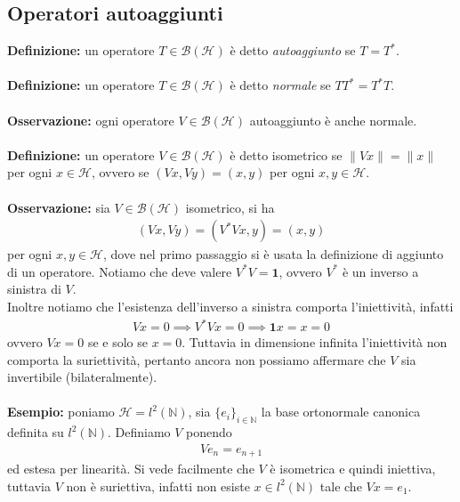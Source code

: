 \documentclass{article}
\numberwithin{equation}{subsection}
\begin{document}
\subsection{Operatori autoaggiunti}
\textbf{Definizione:} un operatore $T \in \mathcal{B}(\mathcal{H})$ è detto \textit{autoaggiunto} se $T = T^*$. \\ \\
\textbf{Definizione:} un operatore $T \in \mathcal{B}(\mathcal{H})$ è detto \textit{normale} se $TT^* = T^*T$. \\ \\
\textbf{Osservazione:} ogni operatore $V \in \mathcal{B}(\mathcal{H})$ autoaggiunto è anche normale. \\ \\
\textbf{Definizione:} un operatore $V \in \mathcal{B}(\mathcal{H})$ è detto isometrico se $\|Vx\| = \|x\|$ per ogni $x \in \mathcal{H}$, ovvero se $(Vx, Vy) = (x, y)$ per ogni $x, y \in \mathcal{H}$. \\ \\
\textbf{Osservazione:} sia $V \in \mathcal{B}(\mathcal{H})$ isometrico, si ha 
\begin{align*}
    (Vx, Vy) = (V^*Vx, y) = (x, y) 
\end{align*}
per ogni $x, y \in \mathcal{H}$, dove nel primo passaggio si è usata la definizione di aggiunto di un operatore. Notiamo che deve valere $V^*V = \mathbf{1}$, ovvero $V^*$ è un inverso a sinistra di $V$. \\
Inoltre notiamo che l'esistenza dell'inverso a sinistra comporta l'iniettività, infatti 
\begin{align*}
    Vx = 0 \implies V^*Vx = 0 \implies \mathbf{1}x = x = 0 
\end{align*}
ovvero $Vx = 0$ se e solo se $x = 0$. Tuttavia in dimensione infinita l'iniettività non comporta la suriettività, pertanto ancora non possiamo affermare che $V$ sia invertibile (bilateralmente). \\ \\
\textbf{Esempio:} poniamo $\mathcal{H} = l^2(\mathbb{N})$, sia $\{e_i\}_{i \in \mathbb{N}}$ la base ortonormale canonica definita su $l^2(\mathbb{N})$. Definiamo $V$ ponendo 
\begin{align*}
    Ve_n = e_{n + 1} 
\end{align*}
ed estesa per linearità. Si vede facilmente che $V$ è isometrica e quindi iniettiva, tuttavia $V$ non è suriettiva, infatti non esiste $x \in l^2(\mathbb{N})$ tale che $Vx = e_1$. \\ \\
\end{document}
